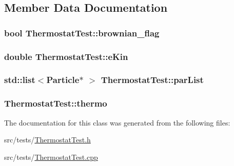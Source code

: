\subsection{Member Data Documentation}
\hypertarget{classThermostatTest_a11bb0e2c5215ea174f7dd2850fe1fdfd}{
\subsubsection[{brownian\-\_\-flag}]{\setlength{\rightskip}{0pt plus 5cm}bool Thermostat\-Test\-::brownian\-\_\-flag\hspace{0.3cm}{\ttfamily [private]}}}\label{classThermostatTest_a11bb0e2c5215ea174f7dd2850fe1fdfd}
\hypertarget{classThermostatTest_aacca1bdd524961644e5dd09a6fff63d1}{
\subsubsection[{e\-Kin}]{\setlength{\rightskip}{0pt plus 5cm}double Thermostat\-Test\-::e\-Kin\hspace{0.3cm}{\ttfamily [private]}}}\label{classThermostatTest_aacca1bdd524961644e5dd09a6fff63d1}
\hypertarget{classThermostatTest_a1aff43e47cd1a702ed5116f42a146bdb}{
\subsubsection[{par\-List}]{\setlength{\rightskip}{0pt plus 5cm}std\-::list$<${\bf Particle}$\ast$ $>$ Thermostat\-Test\-::par\-List\hspace{0.3cm}{\ttfamily [private]}}}\label{classThermostatTest_a1aff43e47cd1a702ed5116f42a146bdb}
\hypertarget{classThermostatTest_a5fec96185d950a0e916ebe1f399f58c6}{
\subsubsection[{thermo}]{ Thermostat\-Test\-::thermo\hspace{0.3cm}{\ttfamily [private]}}}\label{classThermostatTest_a5fec96185d950a0e916ebe1f399f58c6}


The documentation for this class was generated from the following files\-:\begin{DoxyCompactItemize}
\item 
src/tests/\hyperlink{ThermostatTest_8h}{Thermostat\-Test.\-h}\item 
src/tests/\hyperlink{ThermostatTest_8cpp}{Thermostat\-Test.\-cpp}\end{DoxyCompactItemize}
